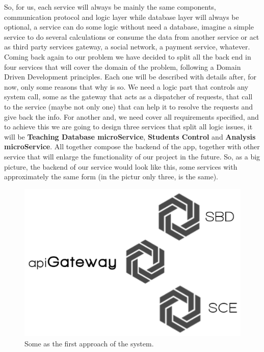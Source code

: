 \noindent So, for us, each service will always be mainly the same components,
communication protocol and logic layer while database layer will always be optional,
a service can do some logic without need a database, imagine a simple service
to do several calculations or consume the data from another service or act as
third party services gateway, a social network, a payment service, whatever.
\intro
Coming back again to our problem we have decided to split all the back end in
four services that will cover the domain of the problem, following a Domain
Driven Development principles. Each one will be described with details after,
for now, only some reasons that why is so. We need a logic part that controls
any system call, some as the gateway that acts as a dispatcher of requests, that
call to the service (maybe not only one) that can help it to resolve the requests
and give back the info.
\intro
For another and, we need cover all requirements specified,
and to achieve this we are going to design three services that split all logic
issues, it will be \textbf{Teaching Database microService}, \textbf{Students Control}
and \textbf{Analysis microService}. All together compose the backend of the app,
together with other service that will enlarge the functionality of our project
in the future.
\intro
So, as a big picture, the backend of our service would look like this, some
services with approximately the same form (in the pictur only three, is the same).

\begin{figure}[H]
  \includegraphics[scale=0.25]{img/graphics/backend.png}
  \centering
  \caption{Some as the first approach of the system.}
\end{figure}

